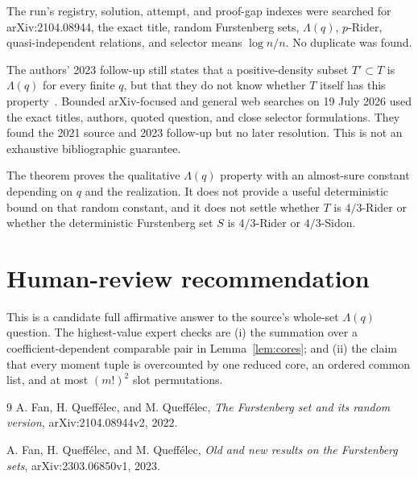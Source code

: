 \documentclass[11pt]{article}
\newcommand{\1}{\mathbf 1}
\begin{document}
The run's registry, solution, attempt, and proof-gap indexes were searched for
arXiv:2104.08944, the exact title, random Furstenberg sets, $\Lambda(q)$,
$p$-Rider, quasi-independent relations, and selector means $\log n/n$.
No duplicate was found.

The authors' 2023 follow-up still states that a positive-density subset
$T'\subset T$ is $\Lambda(q)$ for every finite $q$, but that they do not know
whether $T$ itself has this property~\cite[Section 5.2]{followup}. Bounded
arXiv-focused and general web searches on 19 July 2026 used the exact titles,
authors, quoted question, and close selector formulations. They found the 2021
source and 2023 follow-up but no later resolution. This is not an exhaustive
bibliographic guarantee.

The theorem proves the qualitative $\Lambda(q)$ property with an almost-sure
constant depending on $q$ and the realization. It does not provide a useful
deterministic bound on that random constant, and it does not settle whether
$T$ is $4/3$-Rider or whether the deterministic Furstenberg set $S$ is
$4/3$-Rider or $4/3$-Sidon.

\section{Human-review recommendation}

This is a candidate full affirmative answer to the source's whole-set
$\Lambda(q)$ question. The highest-value expert checks are (i) the summation
over a coefficient-dependent comparable pair in Lemma~\ref{lem:cores}; and
(ii) the claim that every moment tuple is overcounted by one reduced core,
an ordered common list, and at most $(m!)^2$ slot permutations.

\begin{thebibliography}{9}
A. Fan, H. Queff\'elec, and M. Queff\'elec,
\emph{The Furstenberg set and its random version},
arXiv:2104.08944v2, 2022.

A. Fan, H. Queff\'elec, and M. Queff\'elec,
\emph{Old and new results on the Furstenberg sets},
arXiv:2303.06850v1, 2023.
\end{thebibliography}
\end{document}
